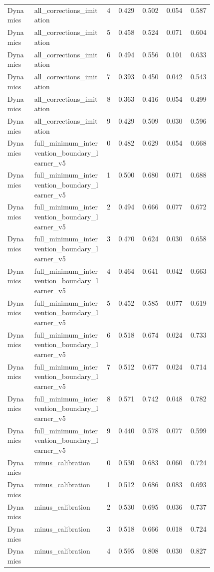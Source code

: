 \documentclass{article}
\begin{document}
\begin{center}
\begin{longtable}{p{0.13\linewidth}p{0.35\linewidth}rrrrr}
Dynamics & all\_corrections\_imitation & 4 & 0.429 & 0.502 & 0.054 & 0.587\\
Dynamics & all\_corrections\_imitation & 5 & 0.458 & 0.524 & 0.071 & 0.604\\
Dynamics & all\_corrections\_imitation & 6 & 0.494 & 0.556 & 0.101 & 0.633\\
Dynamics & all\_corrections\_imitation & 7 & 0.393 & 0.450 & 0.042 & 0.543\\
Dynamics & all\_corrections\_imitation & 8 & 0.363 & 0.416 & 0.054 & 0.499\\
Dynamics & all\_corrections\_imitation & 9 & 0.429 & 0.509 & 0.030 & 0.596\\
Dynamics & full\_minimum\_intervention\_boundary\_learner\_v5 & 0 & 0.482 & 0.629 & 0.054 & 0.668\\
Dynamics & full\_minimum\_intervention\_boundary\_learner\_v5 & 1 & 0.500 & 0.680 & 0.071 & 0.688\\
Dynamics & full\_minimum\_intervention\_boundary\_learner\_v5 & 2 & 0.494 & 0.666 & 0.077 & 0.672\\
Dynamics & full\_minimum\_intervention\_boundary\_learner\_v5 & 3 & 0.470 & 0.624 & 0.030 & 0.658\\
Dynamics & full\_minimum\_intervention\_boundary\_learner\_v5 & 4 & 0.464 & 0.641 & 0.042 & 0.663\\
Dynamics & full\_minimum\_intervention\_boundary\_learner\_v5 & 5 & 0.452 & 0.585 & 0.077 & 0.619\\
Dynamics & full\_minimum\_intervention\_boundary\_learner\_v5 & 6 & 0.518 & 0.674 & 0.024 & 0.733\\
Dynamics & full\_minimum\_intervention\_boundary\_learner\_v5 & 7 & 0.512 & 0.677 & 0.024 & 0.714\\
Dynamics & full\_minimum\_intervention\_boundary\_learner\_v5 & 8 & 0.571 & 0.742 & 0.048 & 0.782\\
Dynamics & full\_minimum\_intervention\_boundary\_learner\_v5 & 9 & 0.440 & 0.578 & 0.077 & 0.599\\
Dynamics & minus\_calibration & 0 & 0.530 & 0.683 & 0.060 & 0.724\\
Dynamics & minus\_calibration & 1 & 0.512 & 0.686 & 0.083 & 0.693\\
Dynamics & minus\_calibration & 2 & 0.530 & 0.695 & 0.036 & 0.737\\
Dynamics & minus\_calibration & 3 & 0.518 & 0.666 & 0.018 & 0.724\\
Dynamics & minus\_calibration & 4 & 0.595 & 0.808 & 0.030 & 0.827\\

\end{longtable}
\end{center}
\end{document}
